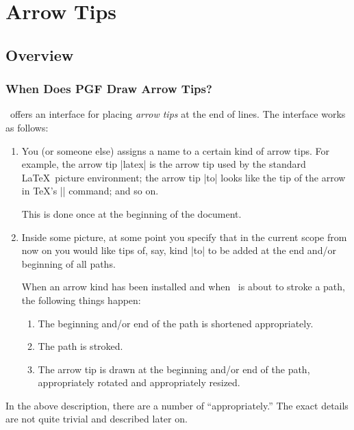 %
%
%


\section{Arrow Tips}
\label{section-arrows}


\subsection{Overview}

\subsubsection{When Does PGF Draw Arrow Tips?}

\pgfname\ offers an interface for placing \emph{arrow tips} at the end
of lines. The interface works as follows:

\begin{enumerate}
\item
  You (or someone else) assigns a name to a certain kind of arrow
  tips. For example, the
  arrow tip |latex| is the arrow tip used by the standard \LaTeX\
  picture environment; the arrow tip |to| looks like the tip of the
  arrow in \TeX's |\to| command; and so on.

  This is done once at the beginning of the document.
\item
  Inside some picture, at some point you specify that in the current
  scope from now on you would like tips of, say, kind |to| to be added
  at the end and/or beginning of all paths.

  When an arrow kind has been installed and when \pgfname\ is about to
  stroke a path, the following things happen:
  \begin{enumerate}
  \item
    The beginning and/or end of the path is shortened appropriately.
  \item
    The path is stroked.
  \item
    The arrow tip is drawn at the beginning and/or end of the path,
    appropriately rotated and appropriately resized.
  \end{enumerate}
\end{enumerate}

In the above description, there are a number of ``appropriately.''
The exact details are not quite trivial and described later on.


